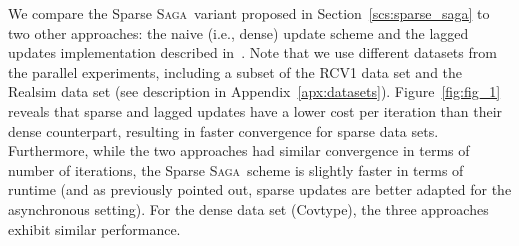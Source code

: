 \documentclass[twoside, 11pt]{article}
\newcommand{\SAGA}{\textsc{Saga}}
\begin{document}
We compare the Sparse \SAGA\ variant proposed in Section~\ref{scs:sparse_saga} to two other approaches: the naive (i.e., dense) update scheme and the lagged updates implementation described in~\citet{SAGA}.
Note that we use different datasets from the parallel experiments, including a subset of the RCV1 data set and the Realsim data set (see description in Appendix~\ref{apx:datasets}).
Figure~\ref{fig:fig_1} reveals that sparse and lagged updates have a lower cost per iteration than their dense counterpart, resulting in faster convergence for sparse data sets.
Furthermore, while the two approaches had similar convergence in terms of number of iterations, the Sparse \SAGA\ scheme is slightly faster in terms of runtime (and as previously pointed out, sparse updates are better adapted for the asynchronous setting).
For the dense data set (Covtype), the three approaches exhibit similar performance.
\end{document}
